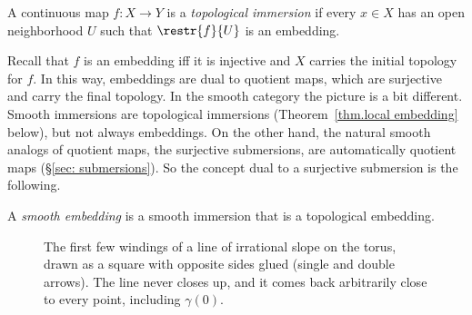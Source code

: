 \begin{defn}
    A continuous map $f:X\to Y$ is a \emph{topological immersion} if every $x\in X$ has an open neighborhood $U$ such that $\restr{f}{U}$ is an embedding.
\end{defn}
Recall that $f$ is an embedding iff it is injective and $X$ carries the initial topology for $f$. In this way, embeddings are dual to quotient maps, which are surjective and carry the final topology. In the smooth category the picture is a bit different. Smooth immersions are topological immersions (Theorem~\ref{thm.local embedding} below), but not always embeddings. On the other hand, the natural smooth analogs of quotient maps, the surjective submersions, are automatically quotient maps (\S\ref{sec: submersions}). So the concept dual to a surjective submersion is the following.

\begin{defn}
    A \emph{smooth embedding} is a smooth immersion that is a topological embedding.
\end{defn}

\begin{figure}[tp]
    \centering
    \caption{The first few windings of a line of irrational slope on the torus, drawn as a square with opposite sides glued (single and double arrows). The line never closes up, and it comes back arbitrarily close to every point, including $\gamma(0)$.}
    \label{fig irrational winding}
\end{figure}

